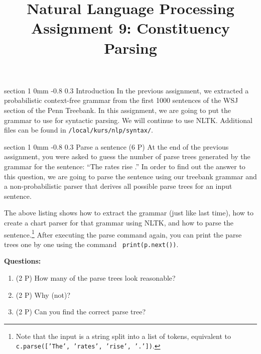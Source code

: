 \documentclass[11pt]{article}
\title{{\LARGE Natural Language Processing}\\[1.5mm]{\large Assignment 9: Constituency Parsing}}
\author{}
\date{} %
\makeatletter
\newcommand{\newsec}[2]{\section{#1}\label{sec:#2}\noindent}
\renewcommand{\section}{\@startsection
{section}%
{1}%
{0mm}%
{-0.8\baselineskip}%
{0.3\baselineskip}%
{\bfseries\large}}%
\makeatother
\begin{document}
 

\maketitle
\vspace{-2mm} \newsec{Introduction}{intro}%
In the previous assignment, we extracted a probabilistic context-free
grammar from the first 1000 sentences of the WSJ section of the Penn
Treebank.  In this assignment, we are going to put the grammar to use
for syntactic parsing. We will continue to use NLTK.  Additional files
can be found in {\tt /local/kurs/nlp/syntax/}.

\newsec{Parse a sentence (6 P)}{chart}%
At the end of the previous assignment, you were asked to guess the
number of parse trees generated by the grammar for the sentence: ``The
rates rise .''  In order to find out the answer to this question, we
are going to parse the sentence using our treebank grammar and a
non-probabilistic parser that derives all possible parse trees for an
input sentence.
\begin{center}
\fbox{

}
\end{center}
The above listing shows how to extract the grammar (just like last
time), how to create a chart parser for that grammar using NLTK, and
how to parse the sentence.\footnote{Note that the input is a string
  split into a list of tokens, equivalent to {\tt c.parse(['The',
    'rates', 'rise', '.'])}.}  After executing the parse command
again, you can print the parse trees one by one using the command {\tt
  print(p.next())}.
\begin{center}
\fbox{

}
\end{center}
{\bf Questions:} 
\begin{enumerate}[noitemsep,topsep=0.2cm]
\item (2 P) How many of the parse trees look reasonable?
\item (2 P) Why (not)?
\item (2 P) Can you find the correct parse tree?
\end{enumerate}
\end{document}
